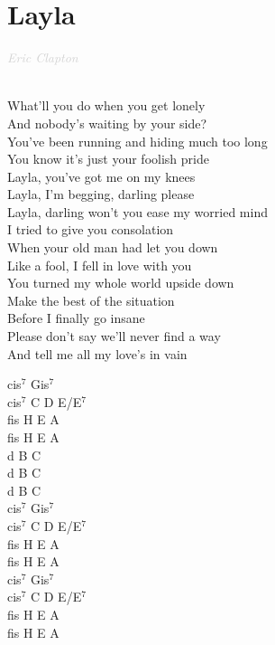 \documentclass[a5paper, 10pt]{book}
\begin{document}
\section{Layla}\textcolor{lightgray}{\textit{ Eric Clapton}}\\~\\
\begin{minipage}[t]{0.7\textwidth}
What'll you do when you get lonely\\
And nobody's waiting by your side?\\
You've been running and hiding much too long\\
You know it's just your foolish pride\\

\hspace*{2mm} Layla, you've got me on my knees\\
\hspace*{2mm} Layla, I'm begging, darling please\\
\hspace*{2mm} Layla, darling won't you ease my worried mind\\

I tried to give you consolation\\
When your old man had let you down\\
Like a fool, I fell in love with you\\
You turned my whole world upside down\\

Make the best of the situation\\
Before I finally go insane\\
Please don't say we'll never find a way\\
And tell me all my love's in vain\\

\end{minipage}
\begin{minipage}[t]{0.3\textwidth}
cis$^7$  Gis$^7$  \\
cis$^7$  C  D  E/E$^7$  \\
fis  H  E  A  \\
fis  H  E  A  \\

d B C\\
d B C\\
d B C\\

cis$^7$  Gis$^7$  \\
cis$^7$  C  D  E/E$^7$  \\
fis  H  E  A  \\
fis  H  E  A  \\

cis$^7$  Gis$^7$  \\
cis$^7$  C  D  E/E$^7$  \\
fis  H  E  A  \\
fis  H  E  A  \\

\end{minipage}
\end{document}
